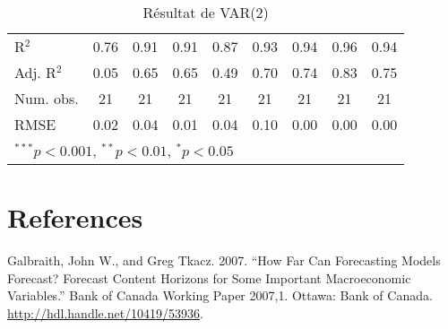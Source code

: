 \documentclass[11pt,]{article}
\begin{document}
\begin{table}[!htbp]
\begin{center}
\begin{tabular}{l c c c c c c c c }
\hline
R$^2$       & 0.76     & 0.91        & 0.91     & 0.87      & 0.93         & 0.94        & 0.96     & 0.94     \\
Adj. R$^2$  & 0.05     & 0.65        & 0.65     & 0.49      & 0.70         & 0.74        & 0.83     & 0.75     \\
Num. obs.   & 21       & 21          & 21       & 21        & 21           & 21          & 21       & 21       \\
RMSE        & 0.02     & 0.04        & 0.01     & 0.04      & 0.10         & 0.00        & 0.00     & 0.00     \\
\hline
\multicolumn{9}{l}{\scriptsize{$^{***}p<0.001$, $^{**}p<0.01$, $^*p<0.05$}}
\end{tabular}
\caption{Résultat de VAR(2)}
\label{table:coefficients}
\end{center}
\end{table}

\FloatBarrier

\hypertarget{references}{%
\section*{References}\label{references}}

\hypertarget{refs}{}
\leavevmode\hypertarget{ref-galbraith2007forecasting}{}%
Galbraith, John W., and Greg Tkacz. 2007. ``How Far Can Forecasting
Models Forecast? Forecast Content Horizons for Some Important
Macroeconomic Variables.'' Bank of Canada Working Paper 2007,1. Ottawa:
Bank of Canada. \url{http://hdl.handle.net/10419/53936}.
\end{document}
